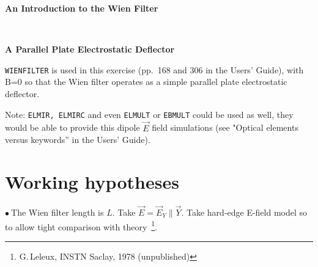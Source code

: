 \documentclass[10pt]{article}
\newcommand{\nib}{\noindent \ensuremath{\bullet~}}
\begin{document}
\thispagestyle{empty}

\begin{minipage}{1.\linewidth}
\bf
\vspace{-2ex}
  
\vspace{-2ex}
  
\vspace{-2ex}
  
\end{minipage}


\vspace{5ex}

\centerline{\LARGE \bf
  An Introduction to the Wien Filter  
}

~

\centerline{\LARGE \bf
 A Parallel Plate Electrostatic Deflector
}

\vspace{5ex}
\author{
F.~M\'eot
\\
Collider-Accelerator Department, BNL, Upton, NY 11973 \\
}



\texttt{WIENFILTER} is used in this exercise (pp.~168 and 306 in the Users' Guide), with B=0  so that the Wien filter operates as a simple parallel plate electrostatic deflector.

Note: \texttt{ELMIR, ELMIRC} and even \texttt{ELMULT} or \texttt{EBMULT}  could be used as well, they would be able to provide this dipole $ \vec E$ field simulations (see "Optical elements versus keywords'' in the Users' Guide).


\section*{Working hypotheses}

\nib The Wien filter length is $ L$. Take $ \vec E =\vec E_Y \parallel \vec Y$.
Take  hard-edge E-field model  so to allow tight comparison with theory~\footnote{G.\,Leleux, INSTN Saclay, 1978 (unpublished)}.
\end{document}
